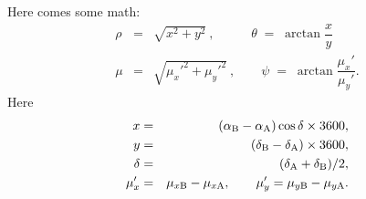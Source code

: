 \documentclass[
 aps, pra,
 amsmath,amssymb,
 11pt,
 final,
tightenlines,
 twoside,
 twocolumn,
 nofloats,
nofootinbib,
 superscriptaddress,
showkeys,
showkeywords,
 ]
{revtex4-2}
\begin{document}
Here comes some math:
\begin{eqnarray}
\rho&=&\sqrt{x^2+y^2}~,~~~\, \qquad \theta\;=\;\arctan\dfrac{x}{y} \nonumber \\
\mu&=&\sqrt{\mu_{x}'^2+\mu_{y}'^2}~, \qquad
\psi\;=\;\arctan\dfrac{\mu_{x}'}{\mu_{y}'}. \nonumber
\end{eqnarray}
Here
\begin{eqnarray}
x&=&(\alpha_{\rm B}-\alpha_{\rm A})\cos{\delta}\times3600,\nonumber\\
y&=&(\delta_{\rm B}-\delta_{\rm A})\times3600,\nonumber\\
\delta&=&(\delta_{\rm A}+\delta_{\rm B})/2,\nonumber\\
\mu_{x}'&=&\mu_{x{\rm B}}-\mu_{x{\rm A}},\nonumber
\qquad\mu_{y}'=\mu_{y{\rm B}}-\mu_{y{\rm A}}\nonumber.
\end{eqnarray}
\end{document}
